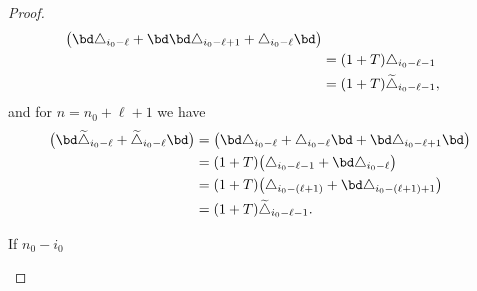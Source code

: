 \begin{proof}
\begin{align*}
		\big(\bd\triangle_{i_0-\ell} + \bd\bd\triangle_{i_0-\ell+1} + \triangle_{i_0-\ell} \bd\big) \\ &=
		(1+T)\triangle_{i_0-\ell-1} \\ &=
		(1+T)\widetilde\triangle_{i_0-\ell-1},
	\end{align*}
	and for $n = n_0+\ell+1$ we have
	\begin{align*}
		\big(\bd \widetilde\triangle_{i_0-\ell} + \widetilde\triangle_{i_0-\ell} \bd\big) &=
		\big(\bd \triangle_{i_0-\ell} + \triangle_{i_0-\ell}\bd + \bd\triangle_{i_0-\ell+1}\bd\big) \\ &=
		(1+T)\big(\triangle_{i_0-\ell-1} + \bd\triangle_{i_0-\ell}\big) \\ &=
		(1+T)\big(\triangle_{i_0-(\ell+1)} + \bd\triangle_{i_0-(\ell+1)+1}\big) \\ &=
		(1+T)\widetilde\triangle_{i_0-\ell-1}.\qedhere
	\end{align*}

	\begin{example*}
		If $n_0-i_0$
	\end{example*}


\end{proof}
